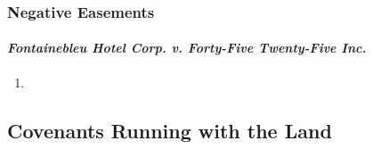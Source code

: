 \subsubsection{Negative Easements}


\paragraph{\emph{Fontainebleu Hotel Corp. v. Forty-Five Twenty-Five Inc.}}

\begin{enumerate}
    \item %
\end{enumerate}


\subsection{Covenants Running with the Land}

